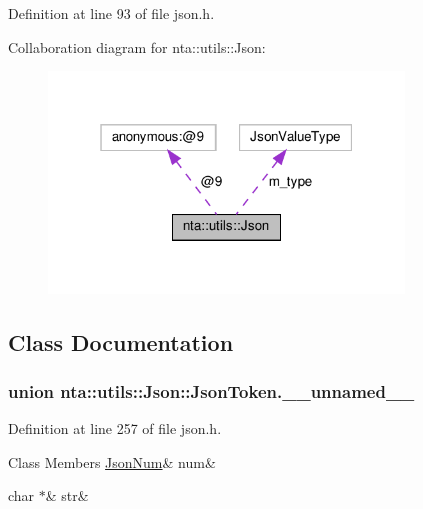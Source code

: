 Definition at line 93 of file json.\+h.



Collaboration diagram for nta\+:\+:utils\+:\+:Json\+:\nopagebreak
\begin{figure}[H]
\begin{center}
\leavevmode
\includegraphics[width=268pt]{d2/de6/classnta_1_1utils_1_1Json__coll__graph}
\end{center}
\end{figure}


\subsection{Class Documentation}
\label{unionnta_1_1utils_1_1Json_1_1JsonToken_8____unnamed____}
\subsubsection{union nta\+:\+:utils\+:\+:Json\+:\+:Json\+Token.\+\_\+\+\_\+unnamed\+\_\+\+\_\+}


Definition at line 257 of file json.\+h.

\begin{DoxyFields}{Class Members}
\mbox{\label{classnta_1_1utils_1_1Json_a0fc3cfbc27e91ea60a787de13dae3e3c}} 
\hyperlink{classnta_1_1utils_1_1JsonNum}{JsonNum}&
num&
\\
\hline

\mbox{\label{classnta_1_1utils_1_1Json_a341be97d9aff90c9978347f66f945b77}} 
char $\ast$&
str&
\\
\hline

\end{DoxyFields}



